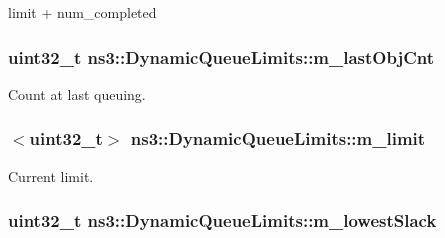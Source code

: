 limit + num\+\_\+completed 

\subsubsection[{\texorpdfstring{m\+\_\+last\+Obj\+Cnt}{m_lastObjCnt}}]{\setlength{\rightskip}{0pt plus 5cm}uint32\+\_\+t ns3\+::\+Dynamic\+Queue\+Limits\+::m\+\_\+last\+Obj\+Cnt\hspace{0.3cm}{\ttfamily [private]}}\hypertarget{classns3_1_1DynamicQueueLimits_a9c73bed5ccb64c8c93ebb8ba3579f6a5}{}\label{classns3_1_1DynamicQueueLimits_a9c73bed5ccb64c8c93ebb8ba3579f6a5}


Count at last queuing. 

\subsubsection[{\texorpdfstring{m\+\_\+limit}{m_limit}}]{$<$uint32\+\_\+t$>$ ns3\+::\+Dynamic\+Queue\+Limits\+::m\+\_\+limit\hspace{0.3cm}{\ttfamily [private]}}\hypertarget{classns3_1_1DynamicQueueLimits_ace85f564a3f7b4aadfed9dc7df775579}{}\label{classns3_1_1DynamicQueueLimits_ace85f564a3f7b4aadfed9dc7df775579}


Current limit. 

\subsubsection[{\texorpdfstring{m\+\_\+lowest\+Slack}{m_lowestSlack}}]{\setlength{\rightskip}{0pt plus 5cm}uint32\+\_\+t ns3\+::\+Dynamic\+Queue\+Limits\+::m\+\_\+lowest\+Slack\hspace{0.3cm}{\ttfamily [private]}}\hypertarget{classns3_1_1DynamicQueueLimits_ab47105c4df36adf2512a8fbc3fd4da4d}{}\label{classns3_1_1DynamicQueueLimits_ab47105c4df36adf2512a8fbc3fd4da4d}


